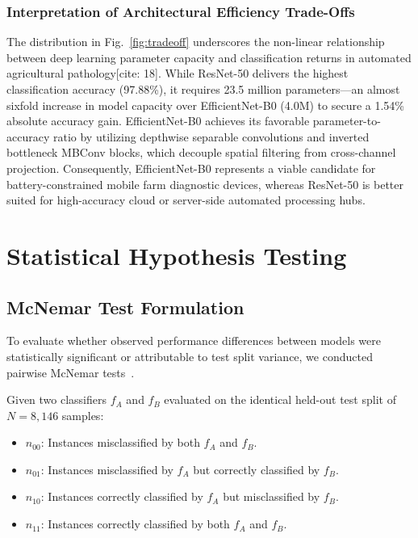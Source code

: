 \documentclass[journal]{IEEEtran}
\begin{document}
\subsubsection{Interpretation of Architectural Efficiency Trade-Offs}
The distribution in Fig.~\ref{fig:tradeoff} underscores the non-linear relationship between deep learning parameter capacity and classification returns in automated agricultural pathology[cite: 18]. While ResNet-50 delivers the highest classification accuracy (97.88\%), it requires 23.5 million parameters—an almost sixfold increase in model capacity over EfficientNet-B0 (4.0M) to secure a 1.54\% absolute accuracy gain. EfficientNet-B0 achieves its favorable parameter-to-accuracy ratio by utilizing depthwise separable convolutions and inverted bottleneck MBConv blocks, which decouple spatial filtering from cross-channel projection. Consequently, EfficientNet-B0 represents a viable candidate for battery-constrained mobile farm diagnostic devices, whereas ResNet-50 is better suited for high-accuracy cloud or server-side automated processing hubs.

\section{Statistical Hypothesis Testing}

\subsection{McNemar Test Formulation}
To evaluate whether observed performance differences between models were statistically significant or attributable to test split variance, we conducted pairwise McNemar tests~\cite{mcnemar1947, dietterich1998}.

Given two classifiers $f_A$ and $f_B$ evaluated on the identical held-out test split of $N = 8,146$ samples:
\begin{itemize}
    \item $n_{00}$: Instances misclassified by both $f_A$ and $f_B$.
    \item $n_{01}$: Instances misclassified by $f_A$ but correctly classified by $f_B$.
    \item $n_{10}$: Instances correctly classified by $f_A$ but misclassified by $f_B$.
    \item $n_{11}$: Instances correctly classified by both $f_A$ and $f_B$.
\end{itemize}
\end{document}
